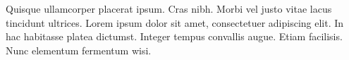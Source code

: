 %
%

Quisque ullamcorper placerat ipsum. Cras nibh. Morbi vel justo vitae lacus tincidunt ultrices. Lorem ipsum dolor sit amet, consectetuer adipiscing elit. In hac habitasse platea dictumst. Integer tempus convallis augue. Etiam facilisis. Nunc elementum fermentum wisi.